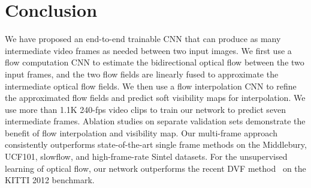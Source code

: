 \documentclass[10pt,twocolumn,letterpaper]{article}
\makeatletter
\def\fps{-fps\@\xspace}
\makeatother
\begin{document}
\section{Conclusion}
We have proposed an end-to-end trainable CNN that can produce as many intermediate video frames as needed between two input images. We first use a flow computation CNN to estimate the bidirectional optical flow between the two input frames, and the two flow fields are linearly fused to approximate the intermediate optical flow fields. We then use a flow interpolation CNN to refine the approximated flow fields and predict soft visibility maps for interpolation. We use more than 1.1K 240\fps video clips to train our network to predict seven intermediate frames. Ablation studies on separate validation sets demonstrate the benefit of flow interpolation and visibility map. Our multi-frame approach consistently outperforms state-of-the-art single frame methods on the Middlebury, UCF101, slowflow, and high-frame-rate Sintel datasets.  For the unsupervised learning of optical flow, our network outperforms the recent DVF method~\cite{liu17video} on the KITTI 2012 benchmark. 




\end{document}
